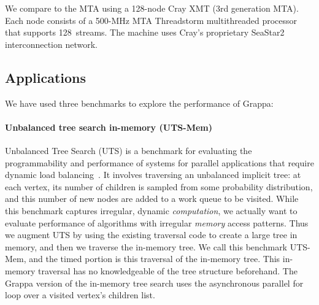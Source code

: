 We compare to the MTA using a 128-node Cray XMT (3rd generation MTA).
Each node consists of a 500-MHz MTA Threadstorm multithreaded processor
that supports 128~streams. The machine uses Cray's proprietary SeaStar2
interconnection network.

\subsection{Applications}

We have used three benchmarks to explore the performance of Grappa:

\paragraph{Unbalanced tree search in-memory (UTS-Mem)} Unbalanced Tree
Search (UTS) is a benchmark for evaluating the programmability and
performance of systems for parallel applications that require dynamic
load balancing~\cite{UTS}. It involves traversing an
unbalanced implicit tree: at each vertex, its number of children is
sampled from some probability distribution, and this number of new nodes
are added to a work queue to be visited. While this benchmark captures
irregular, dynamic \emph{computation}, we actually want to evaluate
performance of algorithms with irregular \emph{memory} access patterns.
Thus we augment UTS by using the existing traversal code to create a
large tree in memory, and then we traverse the in-memory tree. We call
this benchmark UTS-Mem, and the timed portion is this traversal of the
in-memory tree. This in-memory traversal has no knowledgeable of the
tree structure beforehand.  The Grappa version of the in-memory tree
search uses the asynchronous parallel for loop over a visited vertex's
children list.


